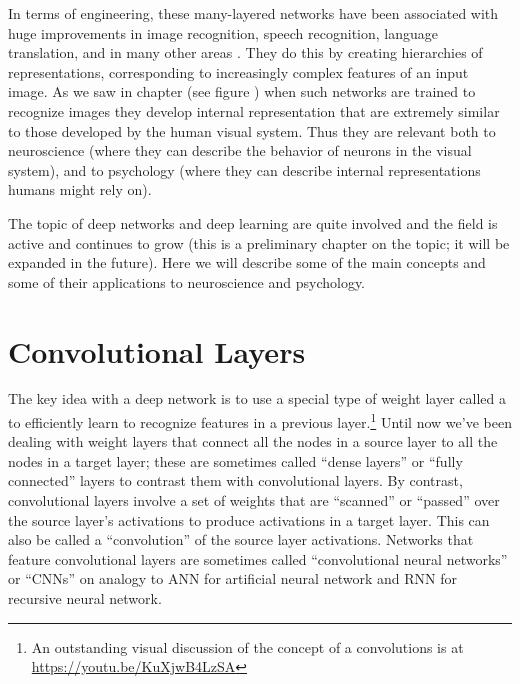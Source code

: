 In terms of engineering, these many-layered networks have been associated with huge improvements in image recognition, speech recognition, language translation, and in many other areas \cite{lecun2015deep, goodfellow2016deep}. They do this by creating hierarchies of representations, corresponding  to increasingly complex features of an input image. As we saw in chapter  (see figure ) when such networks are trained to recognize images they develop internal representation that are extremely similar to those developed by the human visual  system. Thus they are relevant both to neuroscience (where they can describe the behavior of neurons in the visual system), and to psychology (where they can describe internal representations humans might rely on).

The topic of deep networks and deep learning are quite involved and the field is active and continues to grow (this is a preliminary chapter on the topic; it will be expanded in the future). Here we will describe some of the main concepts and some of their applications to neuroscience and psychology.

\section{Convolutional Layers}\label{convolutionalLayer}


The key idea with a deep network is to use a special type of weight layer called a  to efficiently learn to recognize features in a previous layer.\footnote{An outstanding visual discussion of the concept of a convolutions is at \url{https://youtu.be/KuXjwB4LzSA}} Until now we've been dealing with weight layers that connect all the nodes in a source layer to all the nodes in a target layer; these are sometimes called ``dense layers'' or ``fully connected'' layers to contrast them with convolutional layers. By contrast, convolutional layers involve a set of weights that are ``scanned'' or ``passed'' over the source layer's activations to produce activations in a target layer. This can also be called a ``convolution'' of the source layer activations. Networks that feature convolutional layers are sometimes called ``convolutional neural networks'' or ``CNNs'' on analogy to ANN for artificial neural network and RNN for recursive neural network.

